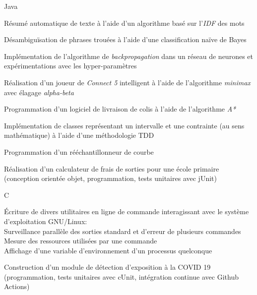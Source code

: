 

\begin{cventries}

  \cventry
    {Java} %
    {} %
    {} %
    {} %
    {
      \begin{cvitems} %
        \item {Résumé automatique de texte à l'aide d'un algorithme basé sur l'\emph{IDF} des mots}
        \item {Désambiguïsation de phrases trouées à l'aide d'une classification naïve de Bayes}
        \item {Implémentation de l'algorithme de \emph{backpropagation} dans un réseau de neurones et expérimentations avec les hyper-paramètres}
        \item {Réalisation d'un joueur de \emph{Connect 5} intelligent à l'aide de l'algorithme \emph{minimax} avec élagage \emph{alpha-beta}}
        \item {Programmation d'un logiciel de livraison de colis à l'aide de l'algorithme \emph{A*}}
        \item {Implémentation de classes représentant un intervalle et une contrainte (au sens mathématique) à l'aide d'une méthodologie TDD}
        \item {Programmation d'un rééchantillonneur de courbe}
        \item {Réalisation d'un calculateur de frais de sorties pour une école primaire (conception orientée objet, programmation, tests unitaires avec jUnit)}
      \end{cvitems}
    }

  \cventry
    {C} %
    {} %
    {} %
    {} %
    {
      \begin{cvitems} %
        \item {Écriture de divers utilitaires en ligne de commande interagissant avec le système d'exploitation GNU/Linux:\\
          \bullet{}\enspace{}Surveillance parallèle des sorties standard et d'erreur de plusieurs commandes\\
          \bullet{}\enspace{}Mesure des ressources utilisées par une commande\\
          \bullet{}\enspace{}Affichage d'une variable d'environnement d'un processus quelconque}
        \item {Construction d'un module de détection d'exposition à la COVID 19 (programmation, tests unitaires avec cUnit, intégration continue avec Github Actions)}
      \end{cvitems}
    }


\end{cventries}
